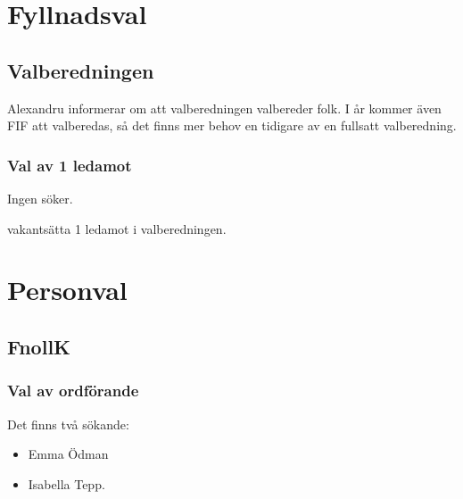 \documentclass[hidelinks]{sektionsmote} %
\begin{document}
\section{Fyllnadsval}
\subsection{Valberedningen}
Alexandru informerar om att valberedningen valbereder folk.
I år kommer även FIF att valberedas, så det finns mer behov en tidigare av en fullsatt valberedning.

\subsubsection{Val av 1 ledamot}
Ingen söker.
\begin{beslut}
  \item vakantsätta 1 ledamot i valberedningen.
\end{beslut}


\section{Personval}
\subsection{FnollK}
\subsubsection{Val av ordförande}
Det finns två sökande:
\begin{itemize}
    \item Emma Ödman
    \item Isabella Tepp.
\end{itemize}
\end{document}
